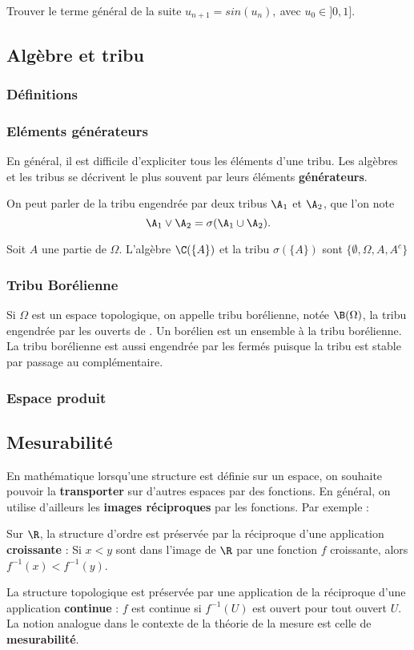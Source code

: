 \be {}
Trouver le terme général de la suite $u_{n+1} = sin(u_n), ~ $avec $u_0 \in ]0,1].$ 
\ee

\subsection{Algèbre et tribu}
\subsubsection{Définitions}
\ed

\ed

\subsubsection{Eléments générateurs }
En général, il est difficile d'expliciter tous les éléments d'une tribu. Les algèbres et les tribus se décrivent le plus souvent par leurs éléments \textbf{générateurs}.
\bd[Générateurs]
\ed

On peut parler de la tribu engendrée par deux tribus $\A_1$ et $\A_2$, que l'on note $$\A_1\lor \A_2 = \sigma(\A_1 \cup \A_2).$$

\bex
Soit $A$ une partie de $\Omega$. L'algèbre $\C(\{A\})$ et la tribu $\sigma(\{A\})$ sont $\{\emptyset, \Omega, A,A^c\}$
\eex

\subsubsection{Tribu Borélienne}
Si $\Omega$ est un espace topologique, on appelle tribu borélienne, notée $\B(\Omega)$, la tribu engendrée par les ouverts de \Omega. Un borélien est un ensemble à la tribu borélienne.
\ed
\bn
La tribu borélienne est aussi engendrée par les fermés puisque la tribu est stable par passage au complémentaire.
\en

\subsubsection{Espace produit}

\subsection{Mesurabilité}
En mathématique lorsqu'une structure est définie sur un espace, on souhaite pouvoir la \textbf{transporter} sur d'autres espaces par des fonctions. En général, on utilise d'ailleurs les \textbf{images réciproques} par les fonctions. 
\bex Par exemple :
\ben
    \item Sur $\R$, la structure d'ordre est préservée par la réciproque d'une application \textbf{croissante} : Si $x < y$ sont dans l'image de $\R$ par une fonction $f$ croissante, alors $f^{-1}(x) < f^{-1}(y)$.
    \item La structure topologique est préservée par une application de la réciproque d'une application \textbf{continue} : $f$ est continue si $f^{-1}(U)$ est ouvert pour tout ouvert $U$.
\een
\eex
La notion analogue dans le contexte de la théorie de la mesure est celle de \textbf{mesurabilité}.

